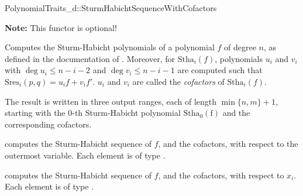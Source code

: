\begin{ccRefConcept}{PolynomialTraits_d::SturmHabichtSequenceWithCofactors}

\textbf{Note:} This functor is optional!

\ccDefinition

Computes the Sturm-Habicht polynomials of a polynomial $f$ of degree $n$, 
as defined in the documentation of .
Moreover, for $\mathrm{Stha}_i(f)$, polynomials $u_i$ and $v_i$
with $\deg u_i\leq n-i-2$ and $\deg v_i\leq n-i-1$ are computed 
such that $\mathrm{Sres}_i(p,q)=u_i f + v_i f'$. $u_i$ and $v_i$ are called
the \emph{cofactors} of $\mathrm{Stha}_i(f)$.
 
The result is written in three output ranges, each of length $\min\{n,m\}+1$, 
starting with the $0$-th Sturm-Habicht polynomial $\mathrm{Stha_0(f)}$ 
and the corresponding cofactors.


\ccOperations
{}
         { computes the Sturm-Habicht sequence of $f$, and the cofactors, 
           with respect to the outermost variable. Each element is of type
           .}

         { computes the Sturm-Habicht sequence of $f$, and the cofactors, 
           with respect to $x_i$. Each element is of type
           .}


\ccSeeAlso

\\
\\
\\
\\
\\
\\
\end{ccRefConcept}
